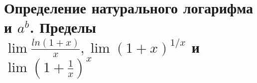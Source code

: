 \section{Определение натурального логарифма и $a^b$. Пределы \\ $\lim{\frac{ln(1+x)}{x}},
\lim{(1+x)^{1/x}}$ и $\lim{(1 + \frac{1}{x})^x}$}